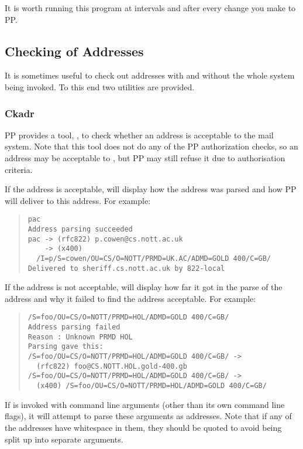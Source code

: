 It is worth running this program at intervals and after every change
you make to PP.

\subsection{Checking of Addresses}

It is sometimes useful to check out addresses  with and without the
whole system being invoked. To this end two utilities are provided.

\subsubsection{Ckadr}

PP provides a tool, , to check whether an address is
acceptable to the mail system.
Note that this tool does not do any of the PP authorization checks,
so an address may be acceptable to , but PP may still
refuse it due to authorisation criteria.

If the address is acceptable,  will display how the
address was parsed and how PP will deliver to this address.
For example:
\begin{quote}\small\begin{verbatim}
pac
Address parsing succeeded
pac -> (rfc822) p.cowen@cs.nott.ac.uk
    -> (x400) 
  /I=p/S=cowen/OU=CS/O=NOTT/PRMD=UK.AC/ADMD=GOLD 400/C=GB/
Delivered to sheriff.cs.nott.ac.uk by 822-local
\end{verbatim}\end{quote}  

If the address is not acceptable,  will display how far
it got in the parse of the address and why it failed to find the
address acceptable.
For example:
\begin{quote}\small\begin{verbatim}
/S=foo/OU=CS/O=NOTT/PRMD=HOL/ADMD=GOLD 400/C=GB/
Address parsing failed
Reason : Unknown PRMD HOL
Parsing gave this:
/S=foo/OU=CS/O=NOTT/PRMD=HOL/ADMD=GOLD 400/C=GB/ ->
  (rfc822) foo@CS.NOTT.HOL.gold-400.gb
/S=foo/OU=CS/O=NOTT/PRMD=HOL/ADMD=GOLD 400/C=GB/ ->
  (x400) /S=foo/OU=CS/O=NOTT/PRMD=HOL/ADMD=GOLD 400/C=GB/
\end{verbatim}\end{quote}

If  is invoked with command line arguments (other than its
own command line flags), it will
attempt to parse these arguments as addresses.
Note that if any of the addresses have whitespace in them, they should
be quoted to avoid being split up into separate arguments.

